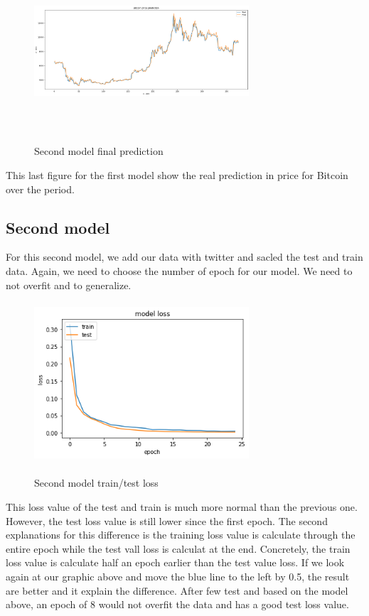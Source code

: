 \documentclass[conference]{IEEEtran}
\begin{document}
\begin{figure}[H]
\includegraphics[width=8cm, height=6cm]{M1_FInal_chart}
\label{fig}
\caption{Second model final prediction}
\end{figure}

This last figure for the first model show the real prediction in price for Bitcoin over the period. 


\subsection{Second model}\label{AA}
For this second model, we add our data with twitter and sacled the test and train data. Again, we need to choose the number of epoch for our model. We need to not overfit  and to generalize. 

\begin{figure}[H]
\includegraphics[width=8cm, height=6cm]{M2_loss}
\label{fig}
\caption{Second model train/test loss}
\end{figure}

This loss value of the test and train is much more normal than the previous one. However, the test loss value is still lower since the first epoch. The second explanations for this difference is the training loss value is calculate through the entire epoch while the test vall loss is calculat at the end. Concretely, the train loss value is calculate half an epoch earlier than the test value loss. If we look again at our graphic above and move the blue line to the left by 0.5, the result are better and it explain the difference.\newline
\newline
After few test and based on the model above, an epoch of 8 would not overfit the data and has a good test loss value.\newline
\end{document}
